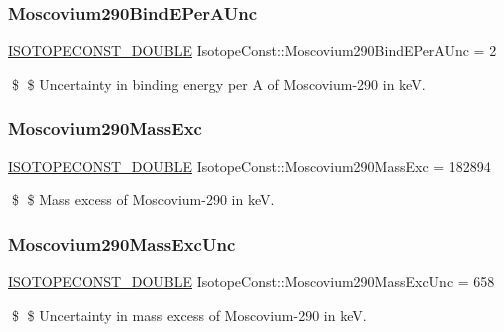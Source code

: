 \subsubsection{\texorpdfstring{Moscovium290\+Bind\+E\+Per\+A\+Unc}{Moscovium290BindEPerAUnc}}
{\footnotesize\ttfamily \mbox{\hyperlink{group___isotope_const-_macros_ga8f45a7272ce02c0b4c65c44636ed719a}{I\+S\+O\+T\+O\+P\+E\+C\+O\+N\+S\+T\+\_\+\+D\+O\+U\+B\+LE}} Isotope\+Const\+::\+Moscovium290\+Bind\+E\+Per\+A\+Unc = 2}

\$ \$ Uncertainty in binding energy per A of Moscovium-\/290 in keV. \mbox{\label{group___isotope_const-_moscovium-_mc290_gaab15979c33dca3af1f2a2f9e42a851c4}} 
\subsubsection{\texorpdfstring{Moscovium290\+Mass\+Exc}{Moscovium290MassExc}}
{\footnotesize\ttfamily \mbox{\hyperlink{group___isotope_const-_macros_ga8f45a7272ce02c0b4c65c44636ed719a}{I\+S\+O\+T\+O\+P\+E\+C\+O\+N\+S\+T\+\_\+\+D\+O\+U\+B\+LE}} Isotope\+Const\+::\+Moscovium290\+Mass\+Exc = 182894}

\$ \$ Mass excess of Moscovium-\/290 in keV. \mbox{\label{group___isotope_const-_moscovium-_mc290_ga3147f71acb660a5852fef9dce123e1fe}} 
\subsubsection{\texorpdfstring{Moscovium290\+Mass\+Exc\+Unc}{Moscovium290MassExcUnc}}
{\footnotesize\ttfamily \mbox{\hyperlink{group___isotope_const-_macros_ga8f45a7272ce02c0b4c65c44636ed719a}{I\+S\+O\+T\+O\+P\+E\+C\+O\+N\+S\+T\+\_\+\+D\+O\+U\+B\+LE}} Isotope\+Const\+::\+Moscovium290\+Mass\+Exc\+Unc = 658}

\$ \$ Uncertainty in mass excess of Moscovium-\/290 in keV. \mbox{\label{group___isotope_const-_moscovium-_mc290_gacfda053c9f4d94ae08b13516afed642a}} 
